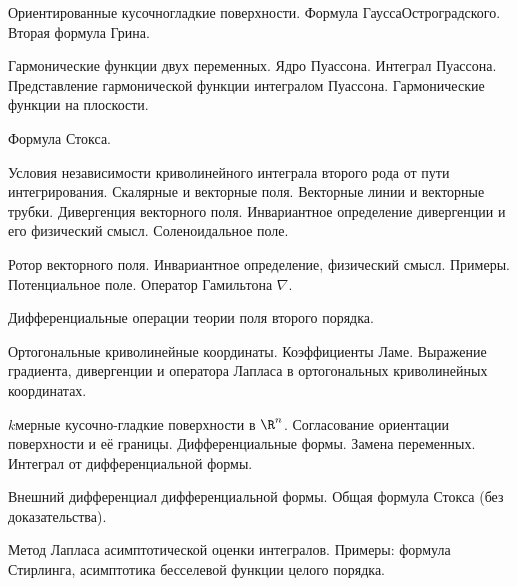 \documentclass[a4paper]{article}
\begin{document}
\begin{nums}{-2}
\item Ориентированные кусочно\д гладкие поверхности. Формула Гаусса\ч Остроградского. Вторая формула Грина.
\item Гармонические функции двух переменных. Ядро Пуассона. Интеграл Пуассона. Представление гармонической функции интегралом Пуассона.
Гармонические функции на плоскости.
\item Формула Стокса.
\item Условия независимости криволинейного интеграла второго рода от пути интегрирования. Скалярные и векторные поля.
Векторные линии и векторные трубки. Дивергенция векторного поля. Инвариантное определение дивергенции и его
физический смысл. Соленоидальное поле.
\item Ротор векторного поля. Инвариантное определение, физический смысл. Примеры. Потенциальное поле. Оператор
Гамильтона $\nabla$.
\item Дифференциальные операции теории поля второго порядка.
\item Ортогональные криволинейные координаты. Коэффициенты Ламе. Выражение градиента, дивергенции и оператора Лапласа в ортогональных
криволинейных координатах.
\item $k$\д мерные кусочно-гладкие поверхности в $\R^n$. Согласование ориентации поверхности и её границы.
Дифференциальные формы. Замена переменных. Интеграл от дифференциальной формы.
\item Внешний дифференциал дифференциальной формы. Общая формула Стокса (без доказательства).
\item Метод Лапласа асимптотической оценки интегралов. Примеры: формула Стирлинга, асимптотика бесселевой
функции целого порядка.
\end{nums}

\medskip\dmvntrail
\end{document}
